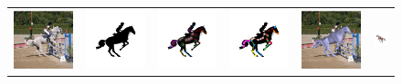 \begin{figure}[h!]
\begin{tabular}{cccccc}
  \includegraphics[trim={0 0.5cm 0 0.5cm},clip,width=0.16\linewidth]{res_horse_new/rgb.jpg} & 
  \includegraphics[trim={0 0.5cm 0 0.5cm},clip,width=0.16\linewidth]{res_horse_new/target.jpg} & 
  \includegraphics[trim={0 0.5cm 0 0.5cm},clip,width=0.16\linewidth]{res_horse_new/heatmap.jpg} & 
  \includegraphics[trim={0 0.5cm 0 0.5cm},clip,width=0.16\linewidth]{res_horse_new/cleaned_skeleton_sil.jpg} &
  \includegraphics[trim={0 0.5cm 0 0.5cm},clip,width=0.16\linewidth]{res_horse_new/3d_fit_overlay_rgb.jpg} & 
  \includegraphics[trim={0 0.5cm 0 0.5cm},clip,width=0.16\linewidth]{res_horse_new/3d_fit_reversed.jpg} \\
  

\end{tabular}
\end{figure}

